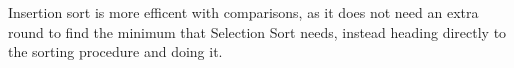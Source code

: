 \documentclass{article}
\begin{document}
Insertion sort is more efficent with comparisons, as it does not need an
extra round to find the minimum that Selection Sort needs, 
instead heading directly to the sorting procedure and doing it. 
\end{document}
